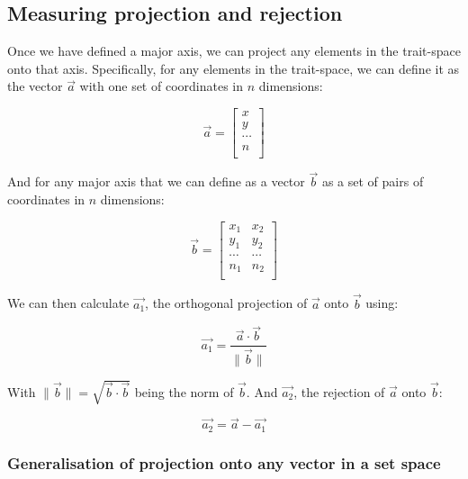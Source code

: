 \documentclass[12pt,letterpaper]{article}
\begin{document}
\subsection{Measuring projection and rejection}

Once we have defined a major axis, we can project any elements in the trait-space onto that axis.
Specifically, for any elements in the trait-space, we can define it as the vector $\vec{a}$ with one set of coordinates in $n$ dimensions:

\begin{equation}
    \vec{a} = 
    \begin{bmatrix}
    x \\
    y \\
    \cdots \\
    n \\
    \end{bmatrix}
\end{equation}

And for any major axis that we can define as a vector $\vec{b}$ as a set of pairs of coordinates in $n$ dimensions:

\begin{equation}
    \vec{b} = 
    \begin{bmatrix}
    x_{1} & x_{2} \\
    y_{1} & y_{2} \\
    \cdots & \cdots \\
    n_{1} & n_{2} \\
    \end{bmatrix}
\end{equation}

We can then calculate $\vec{a_{1}}$, the orthogonal projection of $\vec{a}$ onto $\vec{b}$ using:

\begin{equation}
    \vec{a_{1}} = \frac{\vec{a} \cdot \vec{b}}{\|\vec{b}\|}
\end{equation}

With $\|\vec{b}\| = \sqrt{\vec{b} \cdot \vec{b}}$ being the norm of $\vec{b}$.
And $\vec{a_{2}}$, the rejection of $\vec{a}$ onto $\vec{b}$:

\begin{equation}
    \vec{a_{2}} = \vec{a} - \vec{a_{1}}
\end{equation}

\subsubsection{Generalisation of projection onto any vector in a set space}
\end{document}
